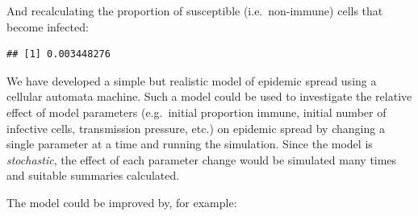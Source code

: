 \documentclass[12pt,a4paper]{book}
\newenvironment{Shaded}{\begin{snugshade}}{\end{snugshade}}
\newcommand{\KeywordTok}[1]{\textcolor[rgb]{0.13,0.29,0.53}{\textbf{#1}}}
\newcommand{\NormalTok}[1]{#1}
\newcommand{\OperatorTok}[1]{\textcolor[rgb]{0.81,0.36,0.00}{\textbf{#1}}}
\newcommand{\StringTok}[1]{\textcolor[rgb]{0.31,0.60,0.02}{#1}}
\theoremstyle{definition}
\theoremstyle{definition}
\theoremstyle{definition}
\theoremstyle{remark}
\begin{document}
And recalculating the proportion of susceptible (i.e.~non-immune) cells
that become infected:

\begin{Shaded}
\end{Shaded}

\begin{verbatim}
## [1] 0.003448276
\end{verbatim}

We have developed a simple but realistic model of epidemic spread using
a cellular automata machine. Such a model could be used to investigate
the relative effect of model parameters (e.g.~initial proportion immune,
initial number of infective cells, transmission pressure, etc.) on
epidemic spread by changing a single parameter at a time and running the
simulation. Since the model is \emph{stochastic}, the effect of each
parameter change would be simulated many times and suitable summaries
calculated.

The model could be improved by, for example:
\end{document}

